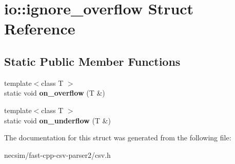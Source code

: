 \hypertarget{structio_1_1ignore__overflow}{}\section{io\+:\+:ignore\+\_\+overflow Struct Reference}
\label{structio_1_1ignore__overflow}
\subsection*{Static Public Member Functions}
\begin{DoxyCompactItemize}
\item 
{\footnotesize template$<$class T $>$ }\\static void {\bfseries on\+\_\+overflow} (T \&)\hypertarget{structio_1_1ignore__overflow_aed3e5026cfa7157ea9270ae377d1026b}{}\label{structio_1_1ignore__overflow_aed3e5026cfa7157ea9270ae377d1026b}

\item 
{\footnotesize template$<$class T $>$ }\\static void {\bfseries on\+\_\+underflow} (T \&)\hypertarget{structio_1_1ignore__overflow_aece692f7a20933149ec99aa1f97458ad}{}\label{structio_1_1ignore__overflow_aece692f7a20933149ec99aa1f97458ad}

\end{DoxyCompactItemize}


The documentation for this struct was generated from the following file\+:\begin{DoxyCompactItemize}
\item 
necsim/fast-\/cpp-\/csv-\/parser2/csv.\+h\end{DoxyCompactItemize}
